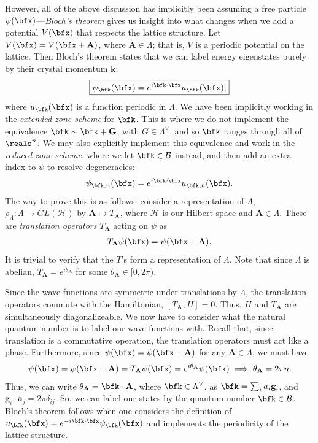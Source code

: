 \documentclass[11pt]{article}
\begin{document}
However, all of the above discussion has implicitly been assuming
a free particle $\psi(\bfx)$---\emph{Bloch's theorem} gives us insight
into what changes when we add a potential $V(\bfx)$ that respects the lattice
structure. Let $V(\bfx) = V(\bfx + \mathbf{A})$, where $\mathbf{A} \in \Lambda$;
that is, $V$ is a periodic potential on the lattice. Then Bloch's theorem
states that we can label energy eigenstates purely by their crystal momentum $\mathbf{k}$:
\begin{align*}
    \boxed{\psi_\bfk(\bfx) = e^{i\bfk \cdot \bfx} u_\bfk(\bfx),}
\end{align*}
where $u_\bfk(\bfx)$ is a function periodic in $\Lambda$. We have
been implicitly working in the \emph{extended zone scheme} for $\bfk$.
This is where we do not implement the equivalence $\bfk \sim \bfk + \mathbf{G}$,
with $G \in \Lambda^\vee$, and so $\bfk$ ranges through all of $\reals^n$.
We may also explicitly implement this equivalence and work in the
\emph{reduced zone scheme}, where we let $\bfk \in \mathcal{B}$ instead,
and then add an extra index to $\psi$ to resolve degeneracies:
\begin{align*}
    \psi_{\bfk, n}(\bfx) = e^{i\bfk \cdot \bfx} u_{\bfk, n}(\bfx).
\end{align*}
The way to prove this is as follows: consider a representation of $\Lambda$,
$\rho_\Lambda \colon \Lambda \to GL(\mathcal{H})$ by $\mathbf{A} \mapsto T_\mathbf{A}$,
where $\mathcal{H}$ is our Hilbert space and $\mathbf{A} \in \Lambda$.
These are \emph{translation operators} $T_\mathbf{A}$ acting on $\psi$ as
\begin{align*}
    T_{\mathbf{A}} \psi(\bfx) = \psi(\bfx + \mathbf{A}).
\end{align*}
It is trivial to verify that the $T$'s form a representation of $\Lambda$.
Note that since $\Lambda$ is abelian, $T_{\mathbf{A}} = e^{i\theta_\mathbf{A}}$
for some $\theta_\mathbf{A} \in [0, 2\pi)$.

Since the wave functions are symmetric under translations by $\Lambda$,
the translation operators commute with the Hamiltonian, $[T_\mathbf{A}, H] = 0$.
Thus, $H$ and $T_\mathbf{A}$ are simultaneously diagonalizeable. We now have
to consider what the natural quantum number is to label our wave-functions
with. Recall that, since translation is a commutative operation, the translation
operators must act like a phase. Furthermore, since $\psi(\bfx) = \psi(\bfx + \mathbf{A})$
for any $\mathbf{A} \in \Lambda$, we must have
\begin{align*}
    \psi(\bfx) = \psi(\bfx + \mathbf{A}) = T_{\mathbf{A}} \psi(\bfx) = e^{i\theta_{\mathbf{A}}} \psi(\bfx)
    \implies \theta_\mathbf{A} = 2\pi n.
\end{align*}
Thus, we can write $\theta_{\mathbf{A}} = \bfk \cdot \mathbf{A}$, where $\bfk \in \Lambda^\vee$,
as $\bfk = \sum_i a_i \mathbf{g}_i$, and $\mathbf{g}_i \cdot \mathbf{a}_j = 2\pi \delta_{ij}$.
So, we can label our states by the quantum number $\bfk \in \mathcal{B}$.
Bloch's theorem follows when one considers the definition of $u_\bfk(\bfx) = e^{-i\bfk \cdot \bfx} \psi_\bfk(\bfx)$
and implements the periodicity of the lattice structure. 
\end{document}
